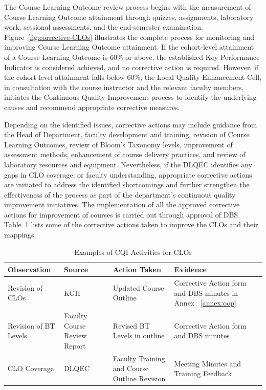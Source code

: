 The Course Learning Outcome review process begins with the measurement of Course Learning Outcome attainment through quizzes, assignments, laboratory work, sessional assessments, and the end-semester examination. Figure~\ref{fig:corrective-CLOs} illustrates the complete process for monitoring and improving Course Learning Outcome attainment. If the cohort-level attainment of a Course Learning Outcome is 60\% or above, the established Key Performance Indicator is considered achieved, and no corrective action is required. However, if the cohort-level attainment falls below 60\%, the Local Quality Enhancement Cell, in consultation with the course instructor and the relevant faculty members, initiates the Continuous Quality Improvement process to identify the underlying causes and recommend appropriate corrective measures. 

Depending on the identified issues, corrective actions may include guidance from the Head of Department, faculty development and training, revision of Course Learning Outcomes, review of Bloom's Taxonomy levels, improvement of assessment methods, enhancement of course delivery practices, and review of laboratory resources and equipment. Nevertheless, if the DLQEC identifies any gaps in CLO coverage, or faculty understanding, appropriate corrective actions are initiated to address the identified shortcomings and further strengthen the effectiveness of the process as part of the department's continuous quality improvement initiatives. The implementation of all the approved corrective actions for improvement of courses is carried out through approval of DBS. Table~\ref{tab:cqi_actions} lists some of the corrective actions taken to improve the CLOs and their mappings.

\begin{table}[ht]
\centering
\footnotesize
\setlength{\tabcolsep}{4pt}
\label{fig:sample12}
\begin{tabular}{
>{\raggedright\arraybackslash}p{4cm}
>{\raggedright\arraybackslash}p{2cm}
>{\raggedright\arraybackslash}p{3cm}
>{\raggedright\arraybackslash}p{2.8cm}
>{\raggedright\arraybackslash}p{3cm}
}
\toprule
\textbf{Observation} &
\textbf{Source} &
\textbf{Action Taken} &
\textbf{Evidence} \\
\midrule
Revision of CLOs &
KGH  &
Updated Course Outline &
Corrective Action form and DBS minutes in Annex ~\ref{annex:oop} \\

Revision of BT Levels &
Faculty Course Review Report &
Revised BT Levels in outline &
Corrective Action form and DBS minutes \\

CLO Coverage &
DLQEC &
Faculty Training and Course Outline Revision &
Meeting Minutes and Training Feedback \\

\bottomrule
\end{tabular}
\caption{Examples of CQI Activities for CLOs}
\label{tab:cqi_actions}
\end{table}

